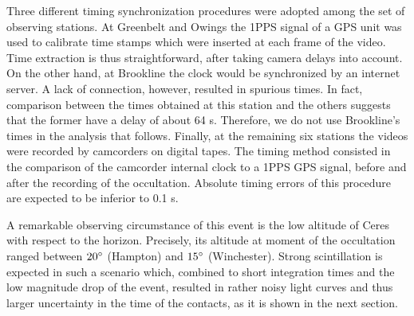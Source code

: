 \documentclass[useAMS,usenatbib]{mn2e}
\begin{document}
Three different timing synchronization procedures were adopted among the set of observing stations. At Greenbelt and Owings the 1PPS signal of a GPS unit was used to calibrate time stamps which were inserted at each frame of the video. Time extraction is thus straightforward, after taking camera delays into account. On the other hand, at Brookline the clock would be synchronized by an internet server. A lack of connection, however, resulted in spurious times. In fact, comparison between the times obtained at this station and the others suggests that the former have a delay of about 64 s. Therefore, we do not use Brookline's %
times in the analysis that follows. Finally, at the remaining six stations the videos were recorded by camcorders on digital tapes. The timing method consisted in the comparison of the camcorder internal clock to a 1PPS GPS signal, before and after the recording of the occultation. Absolute timing errors of this procedure are expected to be inferior to 0.1 s.

A remarkable observing circumstance of this event is the low altitude of Ceres with respect to the horizon. Precisely, its altitude at moment of the occultation ranged between $20\hbox{$^\circ$}$ (Hampton) and $15\hbox{$^\circ$}$ (Winchester). Strong scintillation is expected in such a scenario which, combined to short integration times and the low magnitude drop of the event, resulted in rather noisy light curves and thus larger uncertainty in the time of the contacts, as it is shown in the next section.
\end{document}

